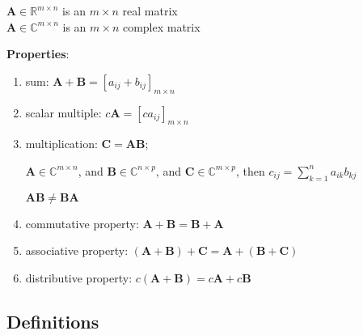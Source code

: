 \documentclass[12pt]{article}
\newcommand{\ve}[1]{\ensuremath{\mathbf{#1}}}
\begin{document}
$\ve{A} \in \mathbb{R}^{m \times n}$ is an $m \times n$ real matrix\\
$\ve{A} \in \mathbb{C}^{m \times n}$ is an $m \times n$ complex matrix

\textbf{Properties}:
%
\begin{enumerate}
\item sum: $\ve{A} + \ve{B} = [a_{ij} + b_{ij}]_{m \times n}$

\item scalar multiple: $c\ve{A} = [c a_{ij}]_{m \times n}$

\item multiplication: $\ve{C} = \ve{A}\ve{B}$;

$\ve{A} \in \mathbb{C}^{m \times n}$, and $\ve{B} \in \mathbb{C}^{n \times p}$, and $\ve{C} \in \mathbb{C}^{m \times p}$, then $c_{ij} = \sum_{k=1}^n a_{ik} b_{kj}$

$\ve{A}\ve{B} \neq \ve{B}\ve{A}$

\item commutative property: $\ve{A} + \ve{B} = \ve{B} + \ve{A}$

\item associative property: $(\ve{A} + \ve{B}) + \ve{C} = \ve{A} + (\ve{B} + \ve{C})$

\item distributive property: $c(\ve{A} + \ve{B}) = c\ve{A} + c\ve{B}$

\end{enumerate}


\subsection{Definitions}
\end{document}
